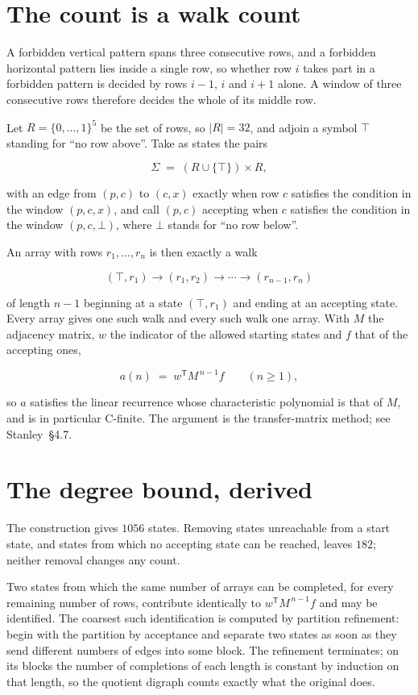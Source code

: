 \documentclass[11pt]{article}
\theoremstyle{definition}
\begin{document}
\section{The count is a walk count}

A forbidden vertical pattern spans three consecutive rows, and a forbidden horizontal pattern lies inside a single row, so whether row $i$ takes part in a forbidden pattern is decided by rows $i-1$, $i$ and $i+1$ alone. A window of three consecutive rows therefore decides the whole of its middle row.

Let $R = \{0,\dots,1\}^{5}$ be the set of rows, so $|R| = 32$, and adjoin a symbol $\top$ standing for ``no row above''. Take as states the pairs

\[\Sigma \;=\; (R \cup \{\top\}) \times R,\]

with an edge from $(p,c)$ to $(c,x)$ exactly when row $c$ satisfies the condition in the window $(p,c,x)$, and call $(p,c)$ accepting when $c$ satisfies the condition in the window $(p,c,\bot)$, where $\bot$ stands for ``no row below''.

An array with rows $r_1,\dots,r_n$ is then exactly a walk

\[(\top,r_1) \to (r_1,r_2) \to \cdots \to (r_{n-1},r_n)\]

of length $n-1$ beginning at a state $(\top,r_1)$ and ending at an accepting state. Every array gives one such walk and every such walk one array. With $M$ the adjacency matrix, $w$ the indicator of the allowed starting states and $f$ that of the accepting ones,

\[a(n) \;=\; w^{\mathsf T} M^{\,n-1} f \qquad (n \ge 1),\]

so $a$ satisfies the linear recurrence whose characteristic polynomial is that of $M$, and is in particular C-finite. The argument is the transfer-matrix method; see Stanley~\S4.7.

\section{The degree bound, derived}

The construction gives $1056$ states. Removing states unreachable from a start state, and states from which no accepting state can be reached, leaves $182$; neither removal changes any count.

Two states from which the same number of arrays can be completed, for every remaining number of rows, contribute identically to $w^{\mathsf T}M^{\,n-1}f$ and may be identified. The coarsest such identification is computed by partition refinement: begin with the partition by acceptance and separate two states as soon as they send different numbers of edges into some block. The refinement terminates; on its blocks the number of completions of each length is constant by induction on that length, so the quotient digraph counts exactly what the original does.
\end{document}
